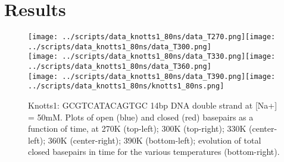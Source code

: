 \section{Results}

\begin{figure} \begin{center}
 
 

\end{center}\end{figure}


\begin{figure}\begin{center}
\texttt{[image: ../scripts/data\_knotts1\_80ns/data\_T270.png]}\texttt{[image: ../scripts/data\_knotts1\_80ns/data\_T300.png]}\\
\texttt{[image: ../scripts/data\_knotts1\_80ns/data\_T330.png]}\texttt{[image: ../scripts/data\_knotts1\_80ns/data\_T360.png]}\\
\texttt{[image: ../scripts/data\_knotts1\_80ns/data\_T390.png]}\texttt{[image: ../scripts/data\_knotts1\_80ns/knotts1\_80ns.png]}
\caption{Knotts1: GCGTCATACAGTGC 14bp DNA double strand at [Na+] = 50mM. Plots of open (blue) and closed (red) basepairs as a function of time, at 270K (top-left); 300K (top-right); 330K (center-left); 360K (center-right); 390K (bottom-left); evolution of total closed basepairs in time for the various temperatures (bottom-right). }\end{center}
\end{figure}



